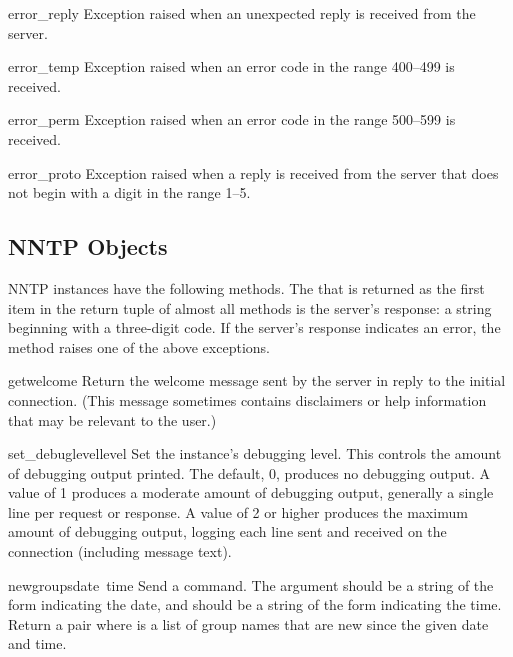 \begin{excdesc}{error_reply}
Exception raised when an unexpected reply is received from the server.
\end{excdesc}

\begin{excdesc}{error_temp}
Exception raised when an error code in the range 400--499 is received.
\end{excdesc}

\begin{excdesc}{error_perm}
Exception raised when an error code in the range 500--599 is received.
\end{excdesc}

\begin{excdesc}{error_proto}
Exception raised when a reply is received from the server that does
not begin with a digit in the range 1--5.
\end{excdesc}

\subsection{NNTP Objects}

NNTP instances have the following methods.  The  that is
returned as the first item in the return tuple of almost all methods
is the server's response: a string beginning with a three-digit code.
If the server's response indicates an error, the method raises one of
the above exceptions.

\renewcommand{\indexsubitem}{(NNTP object method)}

\begin{funcdesc}{getwelcome}{}
Return the welcome message sent by the server in reply to the initial
connection.  (This message sometimes contains disclaimers or help
information that may be relevant to the user.)
\end{funcdesc}

\begin{funcdesc}{set_debuglevel}{level}
Set the instance's debugging level.  This controls the amount of
debugging output printed.  The default, 0, produces no debugging
output.  A value of 1 produces a moderate amount of debugging output,
generally a single line per request or response.  A value of 2 or
higher produces the maximum amount of debugging output, logging each
line sent and received on the connection (including message text).
\end{funcdesc}

\begin{funcdesc}{newgroups}{date\, time}
Send a  command.  The  argument should be a
string of the form  indicating the
date, and  should be a string of the form
 indicating the time.  Return a pair
 where  is a list of
group names that are new since the given date and time.
\end{funcdesc}

